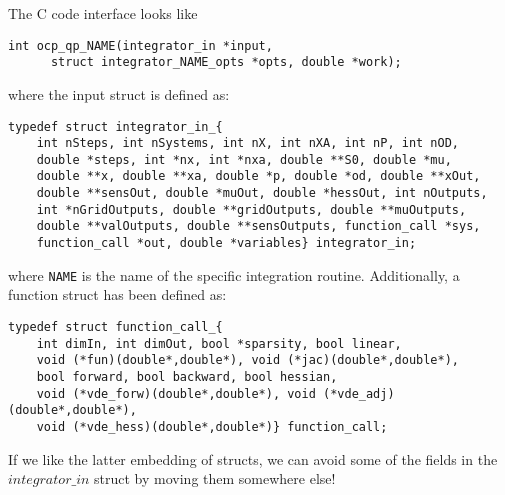 \documentclass{report}
\begin{document}
The C code interface looks like
\begin{verbatim}
int ocp_qp_NAME(integrator_in *input, 
      struct integrator_NAME_opts *opts, double *work);
\end{verbatim}
where the input struct is defined as:
\begin{verbatim}
typedef struct integrator_in_{
    int nSteps, int nSystems, int nX, int nXA, int nP, int nOD, 
    double *steps, int *nx, int *nxa, double **S0, double *mu,
    double **x, double **xa, double *p, double *od, double **xOut, 
    double **sensOut, double *muOut, double *hessOut, int nOutputs,
    int *nGridOutputs, double **gridOutputs, double **muOutputs, 
    double **valOutputs, double **sensOutputs, function_call *sys, 
    function_call *out, double *variables} integrator_in;
\end{verbatim}
where {\tt NAME} is the name of the specific integration routine. Additionally, a function struct has been defined as:
\begin{verbatim}
typedef struct function_call_{
    int dimIn, int dimOut, bool *sparsity, bool linear, 
    void (*fun)(double*,double*), void (*jac)(double*,double*), 
    bool forward, bool backward, bool hessian,
    void (*vde_forw)(double*,double*), void (*vde_adj)(double*,double*),
    void (*vde_hess)(double*,double*)} function_call;
\end{verbatim}
If we like the latter embedding of structs, we can avoid some of the fields in the $integrator\_in$ struct by moving them somewhere else!
\end{document}

